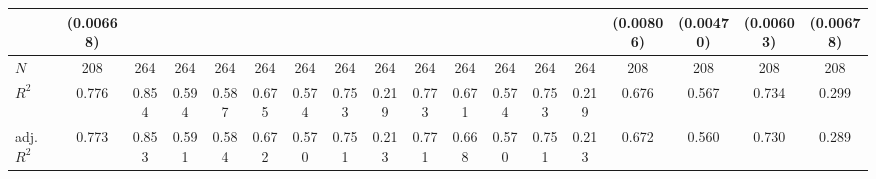 \begin{table}[htbp]
\begin{tabular}{l*{17}{c}}
            &   (0.00668)         &                     &                     &                     &                     &                     &                     &                     &                     &                     &                     &                     &                     &   (0.00806)         &   (0.00470)         &   (0.00603)         &   (0.00678)         \\
\hline
\(N\)       &         208         &         264         &         264         &         264         &         264         &         264         &         264         &         264         &         264         &         264         &         264         &         264         &         264         &         208         &         208         &         208         &         208         \\
\(R^{2}\)   &       0.776         &       0.854         &       0.594         &       0.587         &       0.675         &       0.574         &       0.753         &       0.219         &       0.773         &       0.671         &       0.574         &       0.753         &       0.219         &       0.676         &       0.567         &       0.734         &       0.299         \\
adj. \(R^{2}\)&       0.773         &       0.853         &       0.591         &       0.584         &       0.672         &       0.570         &       0.751         &       0.213         &       0.771         &       0.668         &       0.570         &       0.751         &       0.213         &       0.672         &       0.560         &       0.730         &       0.289         \\
\hline\hline
\end{tabular}
\end{table}
